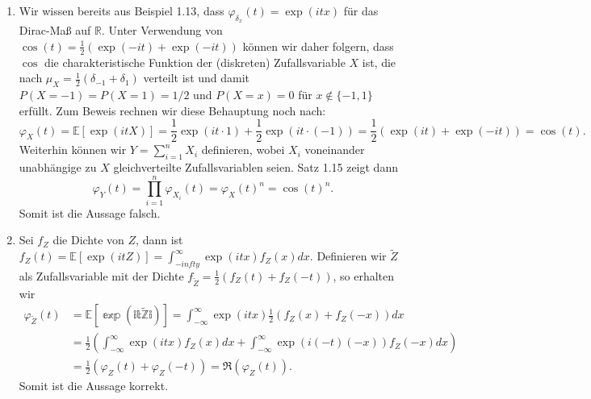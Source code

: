 \documentclass[a4paper]{article}
\let\oldphi\phi
\let\phi\varphi
\let\varphi\oldphi
\begin{document}
\begin{enumerate}
	\item Wir wissen bereits aus Beispiel 1.13, dass $\phi_{\delta_x}(t) = \exp(i t x)$ für das Dirac-Maß auf $\mathds{R}$. Unter Verwendung von $\cos(t) = \frac{1}{2} (\exp(-it) + \exp(-it))$ können wir daher folgern, dass $\cos$ die charakteristische Funktion der (diskreten) Zufallsvariable $X$ ist, die nach $\mu_X = \frac{1}{2}(\delta_{-1} + \delta_{1})$ verteilt ist und damit $P(X = -1) = P(X=1) = 1/2$ und $P(X = x) = 0$ für $x \notin \{-1,1\}$ erfüllt. Zum Beweis rechnen wir diese Behauptung noch nach:
	      \begin{equation*}
		      \phi_X(t) = \mathds{E}[\exp(itX)] = \frac{1}{2} \exp(it\cdot 1) + \frac{1}{2} \exp(it \cdot (-1)) = \frac{1}{2} (\exp(it) + \exp(-it))  = \cos(t)\text{.}
	      \end{equation*}
	      Weiterhin können wir $Y = \sum_{i = 1}^{n} X_i$ definieren, wobei $X_i$ voneinander unabhängige zu $X$ gleichverteilte Zufallsvariablen seien. Satz 1.15 zeigt dann
	      \begin{equation*}
		      \phi_Y(t) = \prod_{i=1}^{n} \phi_{X_i}(t) = \phi_X(t)^n = \cos(t)^n\text{.}
	      \end{equation*}
	      Somit ist die Aussage falsch.
	\item Sei $f_Z$ die Dichte von $Z$, dann ist $f_Z(t) = \mathds{E}[\exp(itZ)] = \int_{-infty}^{\infty} \exp(itx) f_Z(x) dx$. Definieren wir $\tilde Z$ als Zufallsvariable mit der Dichte $f_{\tilde Z} = \frac{1}{2} (f_Z(t) + f_Z(-t))$, so erhalten wir
	      \begin{align*}
		      \phi_{\tilde Z}(t) & = \mathds{E[\exp(it\tilde Zi)]} = \int_{-\infty}^{\infty} \exp(itx) \frac{1}{2} (f_Z(x) + f_Z(-x)) dx                           \\
		                         & = \frac{1}{2} \left( \int_{-\infty}^{\infty} \exp(itx)  f_Z(x) dx + \int_{-\infty}^{\infty} \exp(i(-t)(-x))  f_Z(-x) dx \right) \\
		                         & = \frac{1}{2} \left( \phi_Z(t) + \phi_Z(-t) \right) = \Re(\phi_Z(t))\text{.}
	      \end{align*}
	      Somit ist die Aussage korrekt.
\end{enumerate}
\end{document}
